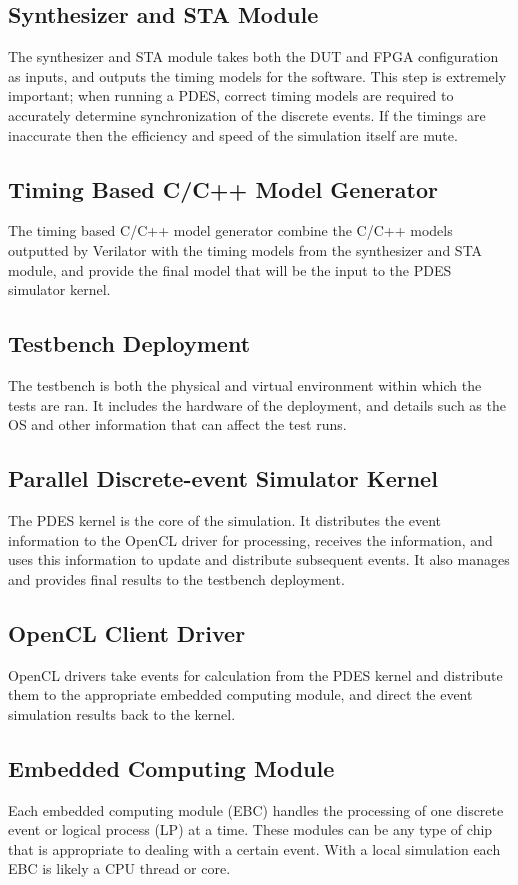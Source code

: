 \documentclass[conference]{IEEEtran}
\begin{document}
\subsection{Synthesizer and STA Module}
The synthesizer and STA module takes both the DUT and FPGA configuration as inputs, and outputs the timing models for the software. This step is extremely important; when running a PDES, correct timing models are required to accurately determine synchronization of the discrete events. If the timings are inaccurate then the efficiency and speed of the simulation itself are mute.

\subsection{Timing Based C/C++ Model Generator}
The timing based C/C++ model generator combine the C/C++ models outputted by Verilator with the timing models from the synthesizer and STA module, and provide the final model that will be the input to the PDES simulator kernel.

\subsection{Testbench Deployment}
The testbench is both the physical and virtual environment within which the tests are ran. It includes the hardware of the deployment, and details such as the OS and other information that can affect the test runs.

\subsection{Parallel Discrete-event Simulator Kernel}
The PDES kernel is the core of the simulation. It distributes the event information to the OpenCL driver for processing, receives the information, and uses this information to update and distribute subsequent events. It also manages and provides final results to the testbench deployment.

\subsection{OpenCL Client Driver}
OpenCL drivers take events for calculation from the PDES kernel and distribute them to the appropriate embedded computing module, and direct the event simulation results back to the kernel.

\subsection{Embedded Computing Module}
Each embedded computing module (EBC) handles the processing of one discrete event or logical process (LP) at a time. These modules can be any type of chip that is appropriate to dealing with a certain event. With a local simulation each EBC is likely a CPU thread or core.
\end{document}
